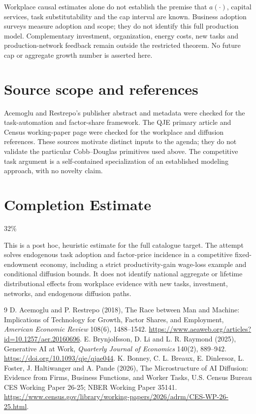 \documentclass[11pt]{article}
\theoremstyle{remark}\newtheorem{remark}[theorem]{Remark}
\begin{document}
Workplace causal estimates alone do not establish the premise that $a(\cdot)$, capital services, task substitutability and the cap interval are known. Business adoption surveys measure adoption and scope; they do not identify this full production model. Complementary investment, organization, energy costs, new tasks and production-network feedback remain outside the restricted theorem. No future cap or aggregate growth number is asserted here.

\section*{Source scope and references}
Acemoglu and Restrepo's publisher abstract and metadata were checked for the task-automation and factor-share framework. The QJE primary article and Census working-paper page were checked for the workplace and diffusion references. These sources motivate distinct inputs to the agenda; they do not validate the particular Cobb--Douglas primitives used above. The competitive task argument is a self-contained specialization of an established modeling approach, with no novelty claim.

\section{Completion Estimate}
32\%

This is a post hoc, heuristic estimate for the full catalogue target.
The attempt solves endogenous task adoption and factor-price incidence in a competitive fixed-endowment economy, including a strict productivity-gain wage-loss example and conditional diffusion bounds. It does not identify national aggregate or lifetime distributional effects from workplace evidence with new tasks, investment, networks, and endogenous diffusion paths.

\begin{thebibliography}{9}
 D. Acemoglu and P. Restrepo (2018), The Race between Man and Machine: Implications of Technology for Growth, Factor Shares, and Employment, \emph{American Economic Review} 108(6), 1488--1542. \url{https://www.aeaweb.org/articles?id=10.1257/aer.20160696}.
 E. Brynjolfsson, D. Li and L. R. Raymond (2025), Generative AI at Work, \emph{Quarterly Journal of Economics} 140(2), 889--942. \url{https://doi.org/10.1093/qje/qjae044}.
 K. Bonney, C. L. Breaux, E. Dinlersoz, L. Foster, J. Haltiwanger and A. Pande (2026), The Microstructure of AI Diffusion: Evidence from Firms, Business Functions, and Worker Tasks, U.S. Census Bureau CES Working Paper 26-25; NBER Working Paper 35141. \url{https://www.census.gov/library/working-papers/2026/adrm/CES-WP-26-25.html}.
\end{thebibliography}
\end{document}
